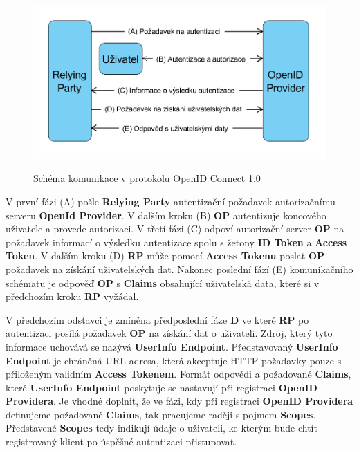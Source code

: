 \documentclass[
  printed, %
  twoside, %
  table,   %
  nolof,     %
  nolot,     %
]{fithesis3}
\begin{document}
\begin{figure}[H]
\caption{Schéma komunikace v protokolu OpenID Connect 1.0}
\centering
\includegraphics[width=12.8cm]{pics/diplomkaOIDC} 
\label{fig:oidc}
\end{figure}
\par 

V první fázi (A) pošle \textbf{Relying Party} autentizační požadavek autorizačnímu serveru \textbf{OpenId Provider}. V dalším kroku (B) \textbf{OP} autentizuje koncového uživatele a provede autorizaci. V třetí fázi (C) odpoví autorizační server \textbf{OP} na požadavek informací o výsledku autentizace spolu s žetony \textbf{ID Token} a \textbf{Access Token}. V dalším kroku (D) \textbf{RP} může pomocí \textbf{Access Tokenu} poslat \textbf{OP} požadavek na získání uživatelských dat. Nakonec poslední fází (E) komunikačního schématu je odpověď \textbf{OP} s \textbf{Claims} obsahující uživatelská data, které si v předchozím kroku \textbf{RP} vyžádal. 
\par

V předchozím odstavci je zmíněna předposlední fáze \textbf{D} ve které \textbf{RP} po autentizaci posílá požadavek \textbf{OP} na získání dat o uživateli. Zdroj, který tyto informace uchovává se nazývá \textbf{UserInfo Endpoint}. Představovaný \textbf{UserInfo Endpoint} je chráněná URL adresa, která akceptuje HTTP požadavky pouze s přiloženým validním \textbf{Access Tokenem}. Formát odpovědi a požadované \textbf{Claims}, které \textbf{UserInfo Endpoint} poskytuje se nastavují při registraci \textbf{OpenID Providera}. Je vhodné doplnit, že ve fázi, kdy při registraci \textbf{OpenID Providera} definujeme požadované \textbf{Claims}, tak pracujeme raději s pojmem \textbf{Scopes}. Představené \textbf{Scopes} tedy indikují údaje o uživateli, ke kterým bude chtít registrovaný klient po úspěšné autentizaci přistupovat.
\par
\end{document}
